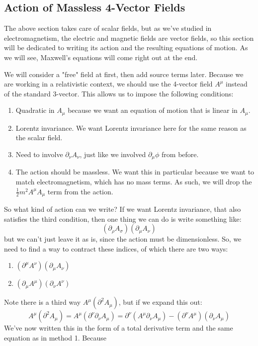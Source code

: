 \subsection{Action of Massless 4-Vector Fields}
The above section takes care of scalar fields, but as we've studied in electromagnetism, the electric and
magnetic fields are vector fields, so this section will be dedicated to writing its action and the resulting
equations of motion. As we will see, Maxwell's equations will come right out at the end. 

We will consider a "free" field at first, then add source terms later. Because we are working in a
relativistic context, we should use the 4-vector field \( A^{\mu} \) instead of the standard 3-vector. This
allows us to impose the following conditions:
\begin{enumerate}[label=\arabic*.]
	\item Quadratic in \( A_\mu \) because we want an equation of motion that is linear in \( A_\mu \).    
	\item Lorentz invariance. We want Lorentz invariance here for the same reason as the scalar field.  
	\item Need to involve \( \partial_\nu A_\nu \), just like we involved \( \partial_\mu \phi \) from
		before. 
	\item The action should be massless. We want this in particular because we want to match
		electromagnetism, which has no mass terms. As such, we will drop the \( \frac{1}{2}m^2 A^{\mu}A_\mu
		\) term from the action.  
\end{enumerate}
So what kind of action can we write? If we want Lorentz invariance, that also satisfies the third condition,
then one thing we can do is write something like:
\[
	(\partial_\rho A_\sigma) (\partial_\mu A_\nu)
\]
but we can't just leave it as is, since the action must be dimensionless. So, we need to find a way to
contract these indices, of which there are two ways:
\begin{enumerate}[label=\arabic*.]
	\item \( (\partial^{\mu}A^{\nu})(\partial_\mu A_\nu) \)
	\item \( (\partial_\mu A^{\mu})(\partial_\nu A^{\nu}) \)
\end{enumerate}
Note there is a third way \( A^{\mu}(\partial^2 A_\mu) \), but if we expand this out:
\[
	A^{\mu}(\partial^2 A_\mu) = A^{\mu}(\partial^{\nu} \partial_\nu A_\mu) = \partial^{\nu}(A^{\mu}
	\partial_\nu A_\mu) - (\partial^{\nu} A^{\mu})(\partial_\nu A_\mu)
\]
We've now written this in the form of a total derivative term and the same equation as in method 1. Because
